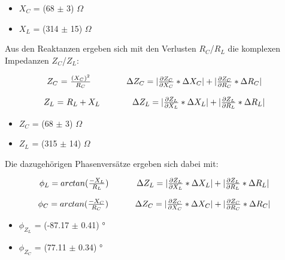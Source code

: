 \documentclass[12pt,a4paper,twoside]{article}
\begin{document}
\begin{itemize}
    \item $X_C$ = (68 $\pm$ 3) $\Omega$
    \item $X_L$ = (314 $\pm$ 15) $\Omega$
\end{itemize}

\noindent
Aus den Reaktanzen ergeben sich mit den Verlusten $R_C$/$R_L$ die komplexen Impedanzen $Z_C$/$Z_L$:

\begin{equation}
    \label{eq:ImpedanzC}
    \centerline{$Z_{C}$ = $\frac{(X_C)^2}{R_C}$ \\ $\Delta Z_{C} = \vert \frac{\partial Z_{C}}{\partial X_C} * \Delta X_C \vert + \vert \frac{\partial Z_{C}}{\partial R_C} * \Delta R_C \vert $ } 
\end{equation}

\begin{equation}
    \label{eq:ImpedanzL}
    \centerline{$Z_{L}$ = $R_L + X_L$ \\ $\Delta Z_{L} = \vert \frac{\partial Z_{L}}{\partial X_L} * \Delta X_L \vert + \vert \frac{\partial Z_L}{\partial R_L} * \Delta R_L \vert $ }
\end{equation}

\begin{itemize}
    \item $Z_C$ = (68 $\pm$ 3) $\Omega$
    \item $Z_L$ = (315 $\pm$ 14) $\Omega$
\end{itemize}

\noindent
Die dazugehörigen Phasenversätze ergeben sich dabei mit:

\begin{equation}
    \label{eq:PhvZL}
    \centerline{$\phi_L = arctan(\frac{-X_L}{R_L})$ \\ $\Delta Z_{L} = \vert \frac{\partial Z_{L}}{\partial X_L} * \Delta X_L \vert + \vert \frac{\partial Z_{L}}{\partial R_L} * \Delta R_L \vert $ }
\end{equation}

\begin{equation}
    \label{eq:PhvZC}
    \centerline{$\phi_C = arctan(\frac{-X_C}{R_C})$ \\ $\Delta Z_{C} = \vert \frac{\partial Z_{C}}{\partial X_C} * \Delta X_C \vert + \vert \frac{\partial Z_{C}}{\partial R_C} * \Delta R_C \vert $ }
\end{equation}

\begin{itemize}
    \item $\phi_{Z_L}$ = (-87.17 $\pm$ 0.41) °
    \item $\phi_{Z_C}$ = (77.11 $\pm$ 0.34) °
\end{itemize}
\end{document}
